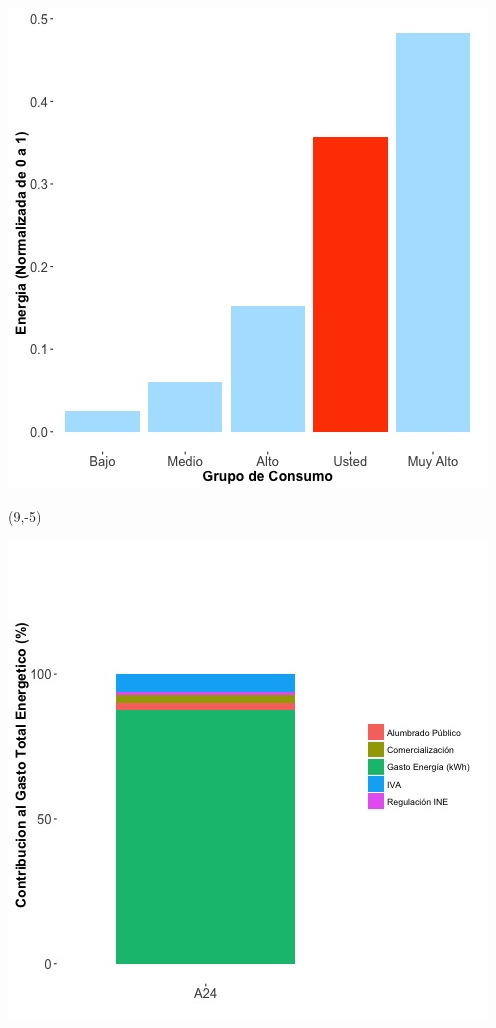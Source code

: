 \documentclass{article}\usepackage[]{graphicx}\usepackage[]{color}
\newenvironment{knitrout}{}{} %
\begin{document}
\begin{knitrout}
\color{fgcolor}
\includegraphics[scale=0.65]{figure/A24_neighbor_plot} 
\end{knitrout}

 \begin{textblock}{1}(9,-5)
\begin{minipage}{20em}
\begingroup

\endgroup
\end{minipage}
\end{textblock}

\begin{knitrout}
\color{fgcolor}
\includegraphics[scale=0.65]{figure/A24_costvars_plot.jpg} 
\end{knitrout}
\end{document}

